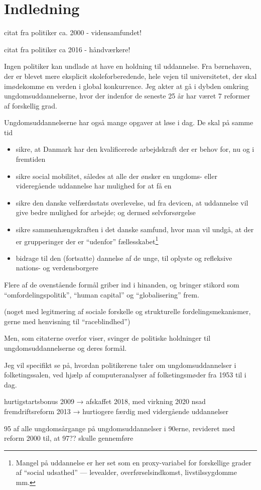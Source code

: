 \section{Indledning}

citat fra politiker ca. 2000 - vidensamfundet!

citat fra politiker ca 2016 - håndværkere!

Ingen politiker kan undlade at have en holdning til uddannelse.
Fra børnehaven, der er blevet mere eksplicit skoleforberedende, hele vejen til universitetet, der skal imødekomme en verden i global konkurrence.
Jeg akter at gå i dybden omkring ungdomsuddannelserne, hvor der indenfor de seneste 25 år har været 7 reformer af forskellig grad.

Ungdomsuddannelserne har også mange opgaver at løse i dag.
De skal på samme tid
\begin{itemize}
  \item
    sikre, at Danmark har den kvalificerede arbejdskraft der er behov for, nu og i fremtiden
  \item
    sikre social mobilitet, således at alle der ønsker en ungdoms- eller videregående uddannelse har mulighed for at få en
  \item
    sikre den danske velfærdsstats overlevelse, ud fra devicen, at uddannelse vil give bedre mulighed for arbejde; og dermed selvforsørgelse 
  \item
    sikre sammenhængskraften i det danske samfund, hvor man vil undgå, at der er grupperinger der er “udenfor” fællesskabet\footnote{Mangel på uddannelse er her set som en proxy-variabel for forskellige grader af “social udsathed” — levealder, overførselsindkomst, livstilssygdomme mm.}
  \item
    bidrage til den (fortsatte) dannelse af de unge, til oplyste og refleksive nations- og verdensborgere
\end{itemize}

Flere af de ovenstående formål griber ind i hinanden, og bringer stikord som “omfordelingspolitik”, “human capital” og “globalisering” frem.

(noget med legitmering af sociale forskelle og strukturelle fordelingsmekanismer, gerne med henvisning til “raceblindhed”)

Men, som citaterne overfor viser, svinger de politiske holdninger til ungdomsuddannelserne og deres formål.


Jeg vil specifikt se på, hvordan politikerene taler om ungdomsuddannelser i folketingssalen, ved hjælp af computeranalyser af folketingsmøder fra 1953 til i dag.

hurtigstartsbonus 2009 → afskaffet 2018, med virkning 2020
nsad
fremdriftsreform 2013 → hurtiogere færdig med vidergående uddannelser


95 \perc af alle ungdomsårgange på ungdomsuddannelser i 90erne, revideret med reform 2000 til, at 97?? skulle gennemføre
